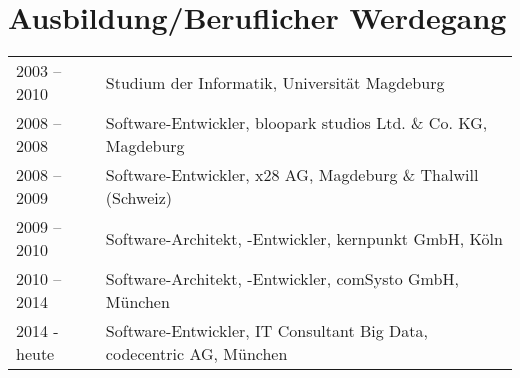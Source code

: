 \section*{Ausbildung/Beruflicher Werdegang}
\begin{longtable}{@{}p{6cm}p{10cm}}
2003 – 2010 	& Studium der Informatik, Universität Magdeburg\\
2008 – 2008 	& Software-Entwickler, bloopark studios Ltd. \& Co. KG, Magdeburg\\
2008 – 2009 	& Software-Entwickler, x28 AG, Magdeburg \&  Thalwill (Schweiz)\\
2009 – 2010  	& Software-Architekt, -Entwickler, kernpunkt GmbH, Köln\\
2010 – 2014  	& Software-Architekt, -Entwickler, comSysto GmbH, München\\
2014 - heute	& Software-Entwickler, IT Consultant Big Data, codecentric AG, München
\end{longtable}

